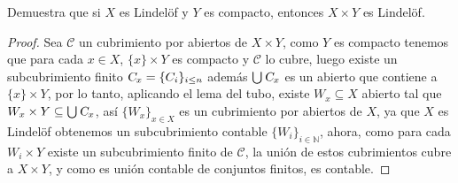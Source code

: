 
   \item Demuestra que si $X$ es Lindelöf y $Y$ es compacto, entonces $X \times Y$ es Lindelöf.

   \begin{proof}
      Sea $\mathcal{C}$ un cubrimiento por abiertos de $X \times Y$, como $Y$ es compacto tenemos que para cada $x \in X$, $\{x\}\times Y$ es compacto y $\mathcal{C}$ lo cubre, luego existe un subcubrimiento finito $\textsl{C}_x=\{C_i\}_{i\leq n}$ además $\bigcup\textsl{C}_x$ es un abierto que contiene a $\{x\}\times Y$, por lo tanto, aplicando el lema del tubo, existe $W_x \subseteq X$ abierto tal que $W_x \times Y \subseteq \bigcup \textsl{C}_x$, así $\{W_x\}_{x\in X}$ es un cubrimiento por abiertos de $X$, ya que $X$ es Lindelöf obtenemos un subcubrimiento contable $\{W_i\}_{i \in \mathbb{N}}$, ahora, como para cada $W_i \times Y$ existe un subcubrimiento finito de $\mathcal{C}$, la unión de estos cubrimientos cubre a $X \times Y$, y como es unión contable de conjuntos finitos, es contable.  
   \end{proof}